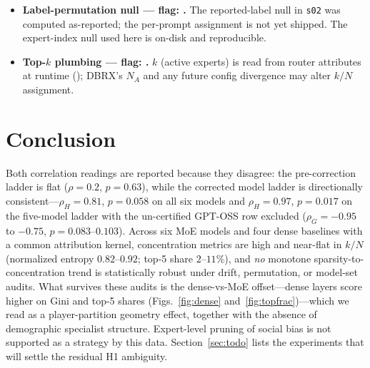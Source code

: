 \documentclass[sigconf]{acmart}
\begin{document}
\begin{itemize}
uniform $5{,}000$-pair capture) yields $\rho_H = 0.81$,
$p = 0.058$, $\rho_G = -0.75$, $p = 0.103$, rising to $\rho_H = 0.97$,
$p = 0.017$ once the un-certified GPT-OSS v0 row is excluded
(directionally consistent on the flag-free core, but the 6-point ladder
remains statistically weak). With only 3--6 ladder positions, Spearman power is
limited and $p$ thresholds are knife-edge; we report drift floors, the
explicit subset audit, and both correlation readings rather than a binary
accept/reject. See Section~\ref{sec:todo} for the planned resolving
experiments.
\item \textbf{Label-permutation null --- flag: \allowbreak
{}.}
The reported-label null in \texttt{s02} was computed as-reported; the
per-prompt assignment is not yet shipped. The expert-index null used here
is on-disk and reproducible.
\item \textbf{Top-$k$ plumbing --- flag: .} $k$
(active experts) is read from router attributes at runtime
(); DBRX's $N_A$ and any future config divergence may
alter $k/N$ assignment.
\end{itemize}

\section{Conclusion}
Both correlation readings are reported because they disagree: the
pre-correction ladder is flat ($\rho = 0.2$, $p = 0.63$), while the
corrected model ladder is directionally consistent---$\rho_H = 0.81$,
$p = 0.058$ on all six models and $\rho_H = 0.97$, $p = 0.017$ on the
five-model ladder with the un-certified GPT-OSS row excluded ($\rho_G =
-0.95$ to $-0.75$, $p = 0.083$--$0.103$). Across six MoE
models and four dense baselines with a common attribution kernel,
concentration metrics are high and near-flat in $k/N$ (normalized entropy
$0.82$--$0.92$; top-5 share $2$--$11\%$), and \emph{no} monotone
sparsity-to-concentration trend is statistically robust under drift,
permutation, or model-set audits. What survives these audits is the
dense-vs-MoE offset---dense layers score higher on Gini and top-5 shares
(Figs.~\ref{fig:dense} and~\ref{fig:topfrac})---which we read as a
player-partition geometry effect, together with the absence of demographic
specialist structure. Expert-level pruning of social bias is not supported
as a strategy by this data. Section~\ref{sec:todo} lists the experiments
that will settle the residual H1 ambiguity.
\end{document}
